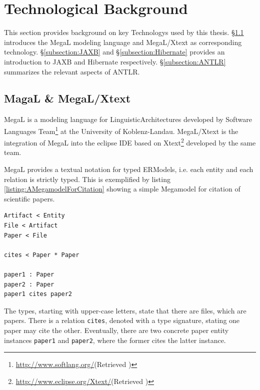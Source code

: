 \section{Technological Background}
\label{section:TechnologicalBackground}
This section provides background on key \glspl{Technology} used by this thesis.
§\ref{subsection:MegaLXText} introduces the \gls{MegaL} modeling language and \gls{MegaL/Xtext} as corresponding technology.
§\ref{subsection:JAXB} and §\ref{subsection:Hibernate} provides an introduction to \gls{JAXB} and \gls{Hibernate} respectively.
§\ref{subsection:ANTLR} summarizes the relevant aspects of \gls{ANTLR}.

\subsection{MagaL \& MegaL/Xtext}
\label{subsection:MegaLXText}
\gls{MegaL} \cite{DBLP:conf/ecmdafa/LammelV14} \cite{DBLP:conf/models/FavreLV12} is a modeling language for \glspl{LinguisticArchitecture} developed by Software Languages Team\footnote{\url{http://www.softlang.org/}(Retrieved )} at the University of Koblenz-Landau.
\gls{MegaL/Xtext} \cite{LukasHaertelBScThesis} \cite{DBLP:journals/programming/HartelHLVH17} is the integration of \gls{MegaL} into the eclipse \gls{IDE} based on Xtext\footnote{\url{http://www.eclipse.org/Xtext/}(Retrieved )} developed by the same team.

\Gls{MegaL} provides a textual notation for typed \glspl{ERModel}, i.e. each entity and each relation is strictly typed.
This is exemplified by listing \ref{listing:AMegamodelForCitation} showing a simple \gls{Megamodel} for citation of scientific papers.
\begin{lstlisting}[caption={A Megamodel for Citation},label={listing:AMegamodelForCitation}]
Artifact < Entity
File < Artifact
Paper < File

cites < Paper * Paper

paper1 : Paper
paper2 : Paper
paper1 cites paper2
\end{lstlisting}
The types, starting with upper-case letters, state that there are files, which are papers.
There is a relation \texttt{cites}, denoted with a type signature, stating one paper may cite the other.
Eventually, there are two concrete paper entity instances \texttt{paper1} and \texttt{paper2}, where the former cites the latter instance.


